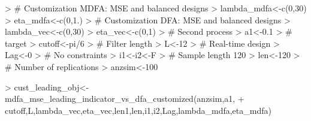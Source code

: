 \documentclass[a4paper]{book}
\begin{document}
\begin{Schunk}
\begin{Sinput}
> # Customization MDFA: MSE and balanced designs
> lambda_mdfa<-c(0,30)
> eta_mdfa<-c(0,1.)
> # Customization DFA: MSE and balanced designs
> lambda_vec<-c(0,30)
> eta_vec<-c(0,1)
> # Second process
> a1<-0.1
> # target
> cutoff<-pi/6
> # Filter length
> L<-12
> # Real-time design
> Lag<-0
> # No constraints
> i1<-i2<-F
> # Sample length 120
> len<-120
> # Number of replications
> anzsim<-100
\end{Sinput}
\end{Schunk}
\begin{Schunk}
\begin{Sinput}
> cust_leading_obj<-mdfa_mse_leading_indicator_vs_dfa_customized(anzsim,a1,
+     cutoff,L,lambda_vec,eta_vec,len1,len,i1,i2,Lag,lambda_mdfa,eta_mdfa)  
\end{Sinput}
\end{Schunk}
\end{document}
